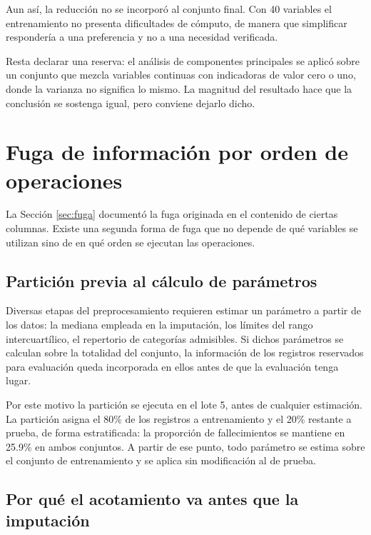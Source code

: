 \documentclass[11pt]{article}
\begin{document}
Aun así, la reducción no se incorporó al conjunto final. Con 40 variables el entrenamiento no
presenta dificultades de cómputo, de manera que simplificar respondería a una preferencia y no a
una necesidad verificada.

Resta declarar una reserva: el análisis de componentes principales se aplicó sobre un conjunto que
mezcla variables continuas con indicadoras de valor cero o uno, donde la varianza no significa lo
mismo. La magnitud del resultado hace que la conclusión se sostenga igual, pero conviene dejarlo
dicho.

\section{Fuga de información por orden de operaciones}
\label{sec:orden}

La Sección \ref{sec:fuga} documentó la fuga originada en el contenido de ciertas columnas. Existe
una segunda forma de fuga que no depende de qué variables se utilizan sino de en qué orden se
ejecutan las operaciones.

\subsection{Partición previa al cálculo de parámetros}

Diversas etapas del preprocesamiento requieren estimar un parámetro a partir de los datos: la
mediana empleada en la imputación, los límites del rango intercuartílico, el repertorio de
categorías admisibles. Si dichos parámetros se calculan sobre la totalidad del conjunto, la
información de los registros reservados para evaluación queda incorporada en ellos antes de que la
evaluación tenga lugar.

Por este motivo la partición se ejecuta en el lote 5, antes de cualquier estimación. La partición
asigna el 80\% de los registros a entrenamiento y el 20\% restante a prueba, de forma
estratificada: la proporción de fallecimientos se mantiene en 25.9\% en ambos conjuntos. A partir
de ese punto, todo parámetro se estima sobre el conjunto de entrenamiento y se aplica sin
modificación al de prueba.

\subsection{Por qué el acotamiento va antes que la imputación}
\end{document}
